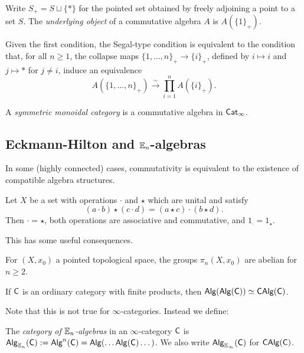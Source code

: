\documentclass{article}
\begin{document}
Write $S_+ = S \sqcup \{ * \}$ for the pointed set obtained by freely adjoining a point to a set $S$.
The \emph{underlying object} of a commutative algebra $A$ is $A(\{1\}_+)$.

\begin{rmk}
	Given the first condition, the Segal-type condition is equivalent to the condition that, for all $n \geq 1$, the collapse maps $\{ 1, \dots, n \}_+ \to \{ i \}_+$, defined by $i \mapsto i$ and $j \mapsto *$ for $j \neq i$, induce an equivalence
	\[
		A(\{1, \dots, n\}_+) \xrightarrow{\sim} \prod_{i=1}^n A(\{i\}_+).
	\]
\end{rmk}

\begin{ex}
	A \emph{symmetric monoidal category} is a commutative algebra in $\mathsf{Cat}_\infty$.
\end{ex}

\subsection{Eckmann-Hilton and $\mathbb{E}_n$-algebras}

In some (highly connected) cases, commutativity is equivalent to the existence of compatible algebra structures.

\begin{lem}
	Let $X$ be a set with operations $\cdot$ and $\star$ which are unital and satisfy
	\[
		(a \cdot b) \star (c \cdot d) = (a \star c) \cdot (b \star d).
	\]
	Then $\cdot = \star$, both operations are associative and commutative, and $1_\cdot = 1_\star$.
\end{lem}

This has some useful consequences.

\begin{cor}
	For $(X, x_0)$ a pointed topological space, the groups $\pi_n(X, x_0)$ are abelian for $n \geq 2$.
\end{cor}

\begin{cor}
	If $\mathsf{C}$ is an ordinary category with finite products, then $\mathsf{Alg}(\mathsf{Alg}(\mathsf{C})) \simeq \mathsf{CAlg}(\mathsf{C})$.
\end{cor}

Note that this is not true for $\infty$-categories.
Instead we define:

\begin{dfn}
	The \emph{category of $\mathbb{E}_n$-algebras} in an $\infty$-category $\mathsf{C}$ is $\mathsf{Alg}_{\mathbb{E}_n}(\mathsf{C}) := \mathsf{Alg}^n(\mathsf{C}) = \mathsf{Alg}(\dots\mathsf{Alg}(\mathsf{C})\dots)$.
	We also write $\mathsf{Alg}_{\mathbb{E}_\infty}(\mathsf{C})$ for $\mathsf{CAlg}(\mathsf{C})$.
\end{dfn}
\end{document}
